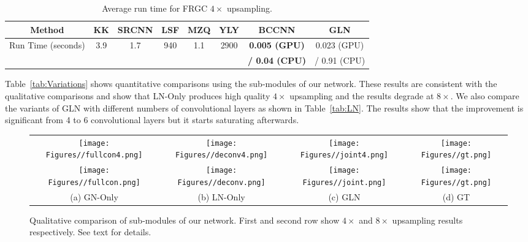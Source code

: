 \documentclass[runningheads]{llncs}
\begin{document}
\begin{table}[t]
    \caption{Average run time for FRGC $4\times$ upsampling.}
    \vspace{-4mm}
    \label{tab:times}
    \centering
    \small
        \begin{tabular}[t]{|c|c|c|c|c|c|c|c|}
        \hline
        Method &
        KK     &
        SRCNN &
        LSF        &
        MZQ      &
        YLY   &
        BCCNN &
        GLN   \\
        \hline
        Run Time (seconds)
        & 3.9
        & 1.7
        & 940
        & 1.1
        & 2900
        & \bf 0.005 (GPU)
        & 0.023 (GPU) \\
        & & & & & & \bf / 0.04 (CPU) & / 0.91 (CPU)\\
        \hline
        \end{tabular}
\end{table}




Table~\ref{tab:Variations} shows quantitative comparisons using the sub-modules of our network. These results are consistent with the qualitative comparisons and show that LN-Only produces high quality $4 \times$ upsampling and the results degrade at $8 \times$. We also compare the variants of GLN with different numbers of convolutional layers as shown in Table~\ref{tab:LN}. The results show that the improvement is significant from 4 to 6 convolutional layers but it starts saturating afterwards.





\begin{figure}[!tb]
  \centering
  \small
	\begin{tabular}{cccc}	
  \texttt{[image: Figures//fullcon4.png]}  &
	\texttt{[image: Figures//deconv4.png]} &
	\texttt{[image: Figures//joint4.png]} &
	\texttt{[image: Figures//gt.png]} 	\\
  \texttt{[image: Figures//fullcon.png]}  &
	\texttt{[image: Figures//deconv.png]}  &
	\texttt{[image: Figures//joint.png]}  &
	\texttt{[image: Figures//gt.png]} \\
	(a) GN-Only & (b) LN-Only & (c) GLN & (d) GT \\	
	\end{tabular}
\vspace{-2mm}
  \caption{Qualitative comparison of sub-modules of our network. First and second row show $4 \times$ and $8 \times$ upsampling results respectively. See text for details.}
\label{fig:subnetwork}
\end{figure}
\end{document}
